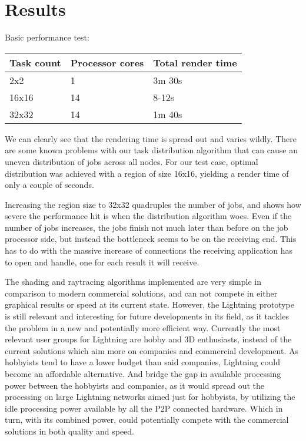 \chapter{Results}

Basic performance test:
\begin{center}
    \begin{tabular}{ | l | l | l |} \hline
    Task count & Processor cores & Total render time \\ \hline
    2x2 & 1 & 3m 30s \\ \hline
    16x16 & 14 & 8-12s \\ \hline
    32x32 & 14 & 1m 40s \\ \hline
    \end{tabular}
\end{center}

We can clearly see that the rendering time is spread out and varies wildly. There are
some known problems with our task distribution algorithm that can cause an uneven distribution
of jobs across all nodes. For our test case, optimal distribution was achieved with a region of size 16x16, yielding a render time of only a couple of seconds.

Increasing the region size to 32x32 quadruples the number of jobs, and shows how severe the performance hit is
when the distribution algorithm woes. Even if the number of jobs increases, the jobs finish not much later than before on the job processor side, but instead the bottleneck seems to be on the receiving end. This has to do with the massive increase of connections the receiving application has to open and handle, one for each result it will receive.

The shading and raytracing algorithms implemented are very simple in comparison to modern commercial solutions, and can not compete in either graphical results or speed at its current state. However, the Lightning prototype is still relevant and interesting for future developments in its field, as it tackles the problem in a new and potentially more efficient way. Currently the most relevant user groups for Lightning are hobby and 3D enthusiasts, instead of the current solutions which aim more on companies and commercial development. As hobbyists tend to have a lower budget than said companies, Lightning could become an affordable alternative. And bridge the gap in available processing power between the hobbyists and companies, as it would spread out the processing on large Lightning networks aimed just for hobbyists, by utilizing the idle processing power available by all the P2P connected hardware. Which in turn, with its combined power, could potentially compete with the commercial solutions in both quality and speed.


